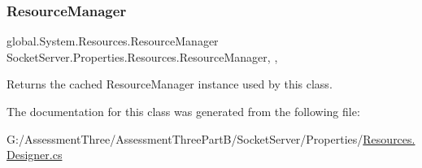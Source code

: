 \subsubsection{\texorpdfstring{Resource\+Manager}{ResourceManager}}
{\footnotesize\ttfamily global.\+System.\+Resources.\+Resource\+Manager Socket\+Server.\+Properties.\+Resources.\+Resource\+Manager\hspace{0.3cm}{\ttfamily [static]}, {\ttfamily [get]}, {\ttfamily [package]}}



Returns the cached Resource\+Manager instance used by this class. 



The documentation for this class was generated from the following file\+:\begin{DoxyCompactItemize}
\item 
G\+:/\+Assessment\+Three/\+Assessment\+Three\+Part\+B/\+Socket\+Server/\+Properties/\hyperlink{_socket_server_2_properties_2_resources_8_designer_8cs}{Resources.\+Designer.\+cs}\end{DoxyCompactItemize}
